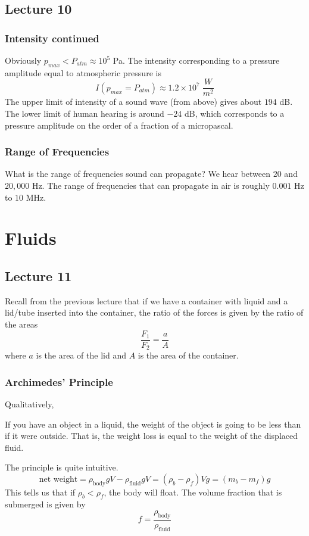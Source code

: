 \documentclass{report}
\numberwithin{equation}{section}
\begin{document}
\section{Lecture 10}
\subsection{Intensity continued}
Obviously $p_{max} < P_{atm} \approx 10^5$ Pa. The intensity corresponding to a pressure amplitude equal to atmospheric pressure is
\begin{equation*}
	I(p_{max} = P_{atm}) \approx 1.2\times 10^{7} \;\frac{W}{m^2}
\end{equation*}
The upper limit of intensity of a sound wave (from above) gives about $194$ dB. The lower limit of human hearing is around $-24$ dB, which corresponds to a pressure amplitude on the order of a fraction of a micropascal.
\subsection{Range of Frequencies}
What is the range of frequencies sound can propagate? We hear between $20$ and $20{,}000$ Hz. The range of frequencies that can propagate in air is roughly $0.001$ Hz to $10$ MHz.
\chapter{Fluids}
\section{Lecture 11}
Recall from the previous lecture that if we have a container with liquid and a lid/tube inserted into the container, the ratio of the forces is given by the ratio of the areas
\begin{equation}
    \frac{F_1}{F_2} = \frac{a}{A}
\end{equation}
where $a$ is the area of the lid and $A$ is the area of the container.
\subsection{Archimedes' Principle}
Qualitatively,
\begin{center}
    If you have an object in a liquid, the weight of the object is going to be less than if it were outside. That is, the weight loss
    is equal to the weight of the displaced fluid.
\end{center}
The principle is quite intuitive.
\begin{equation}
    \text{net weight} = \rho_{\text{body}}gV -\rho_{\text{fluid}}gV = (\rho_b - \rho_f)Vg = (m_b - m_f)g
\end{equation}
This tells us that if $\rho_b < \rho_f$, the body will float. The volume fraction that is submerged is given by
\begin{equation}
        f = \frac{\rho_{\text{body}}}{\rho_{\text{fluid}}}
\end{equation}
\end{document}
